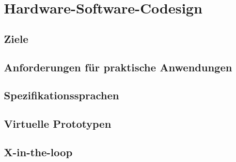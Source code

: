 \section{Hardware-Software-Codesign}

\subsection{Ziele}


\subsection{Anforderungen für praktische Anwendungen}


\subsection{Spezifikationssprachen}

\subsection{Virtuelle Prototypen}


\subsection{X-in-the-loop}